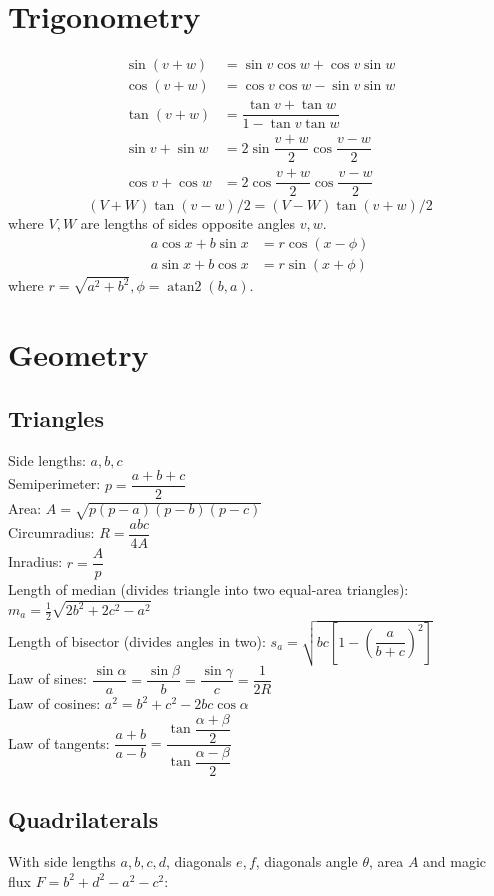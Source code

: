 \section{Trigonometry}
\begin{align*}
\sin(v+w)&{}=\sin v\cos w+\cos v\sin w\\
\cos(v+w)&{}=\cos v\cos w-\sin v\sin w\\
\tan(v+w)&{}=\dfrac{\tan v+\tan w}{1-\tan v\tan w}\\
\sin v+\sin w&{}=2\sin\dfrac{v+w}{2}\cos\dfrac{v-w}{2}\\
\cos v+\cos w&{}=2\cos\dfrac{v+w}{2}\cos\dfrac{v-w}{2}
\end{align*}
\[ (V+W)\tan(v-w)/2{}=(V-W)\tan(v+w)/2 \]
where $V, W$ are lengths of sides opposite angles $v, w$.
\begin{align*}
	a\cos x+b\sin x&=r\cos(x-\phi)\\
	a\sin x+b\cos x&=r\sin(x+\phi)
\end{align*}
where $r=\sqrt{a^2+b^2}, \phi=\operatorname{atan2}(b,a)$.

\section{Geometry}

\subsection{Triangles}
Side lengths: $a,b,c$\\
Semiperimeter: $p=\dfrac{a+b+c}{2}$\\
Area: $A=\sqrt{p(p-a)(p-b)(p-c)}$\\
Circumradius: $R=\dfrac{abc}{4A}$\\
Inradius: $r=\dfrac{A}{p}$\\
Length of median (divides triangle into two equal-area triangles): $m_a=\tfrac{1}{2}\sqrt{2b^2+2c^2-a^2}$\\
Length of bisector (divides angles in two): $s_a=\sqrt{bc\left[1-\left(\dfrac{a}{b+c}\right)^2\right]}$\\
Law of sines: $\dfrac{\sin\alpha}{a}=\dfrac{\sin\beta}{b}=\dfrac{\sin\gamma}{c}=\dfrac{1}{2R}$\\
Law of cosines: $a^2=b^2+c^2-2bc\cos\alpha$\\
Law of tangents: $\dfrac{a+b}{a-b}=\dfrac{\tan\dfrac{\alpha+\beta}{2}}{\tan\dfrac{\alpha-\beta}{2}}$\\

\subsection{Quadrilaterals}
With side lengths $a,b,c,d$, diagonals $e, f$, diagonals angle $\theta$, area $A$ and
magic flux $F=b^2+d^2-a^2-c^2$:

